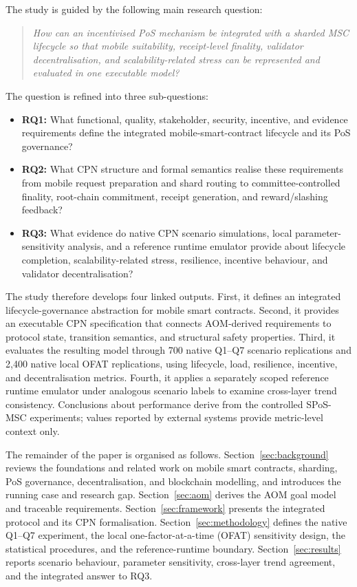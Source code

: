 \documentclass[a4paper,fleqn]{cas-sc}
\begin{document}
The study is guided by the following main research question:
\begin{quote}
\emph{How can an incentivised PoS mechanism be integrated with a sharded MSC lifecycle so that mobile suitability, receipt-level finality, validator decentralisation, and scalability-related stress can be represented and evaluated in one executable model?}
\end{quote}

The question is refined into three sub-questions:

\begin{itemize}
    \item \textbf{RQ1:} What functional, quality, stakeholder, security, incentive, and evidence requirements define the integrated mobile-smart-contract lifecycle and its PoS governance?

    \item \textbf{RQ2:} What CPN structure and formal semantics realise these requirements from mobile request preparation and shard routing to committee-controlled finality, root-chain commitment, receipt generation, and reward/slashing feedback?

    \item \textbf{RQ3:} What evidence do native CPN scenario simulations, local parameter-sensitivity analysis, and a reference runtime emulator provide about lifecycle completion, scalability-related stress, resilience, incentive behaviour, and validator decentralisation?
\end{itemize}

The study therefore develops four linked outputs. First, it defines an integrated lifecycle-governance abstraction for mobile smart contracts. Second, it provides an executable CPN specification that connects AOM-derived requirements to protocol state, transition semantics, and structural safety properties. Third, it evaluates the resulting model through 700 native Q1--Q7 scenario replications and 2,400 native local OFAT replications, using lifecycle, load, resilience, incentive, and decentralisation metrics. Fourth, it applies a separately scoped reference runtime emulator under analogous scenario labels to examine cross-layer trend consistency. Conclusions about performance derive from the controlled SPoS-MSC experiments; values reported by external systems provide metric-level context only.

The remainder of the paper is organised as follows.
Section~\ref{sec:background} reviews the foundations and related work on mobile smart contracts, sharding, PoS governance, decentralisation, and blockchain modelling, and introduces the running case and research gap. Section~\ref{sec:aom} derives the AOM goal model and traceable requirements. Section~\ref{sec:framework} presents the integrated protocol and its CPN formalisation. Section~\ref{sec:methodology} defines the native Q1--Q7 experiment, the local one-factor-at-a-time (OFAT) sensitivity design, the statistical procedures, and the reference-runtime boundary. Section~\ref{sec:results} reports scenario behaviour, parameter sensitivity, cross-layer trend agreement, and the integrated answer to RQ3.
\end{document}
